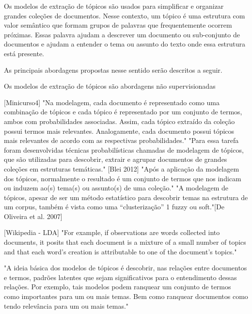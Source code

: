


Os modelos de extração de tópicos são usados para simplificar e organizar grandes coleções de documentos. Nesse contexto, um tópico é uma estrutura com valor semântico que formam grupos de palavras que frequentemente ocorrem próximas. Essas palavra ajudam a descrever um documento ou sub-conjunto de documentos e ajudam a entender o tema ou assunto do texto onde essa estrutura está presente.

As principais abordagens propostas nesse sentido serão descritos a seguir.

Os modelos de extração de tópicos são abordagens não supervisionadas 






[Minicurso4] 
"Na modelagem, cada documento é representado como uma combinação de tópicos e cada tópico é representado por um conjunto de termos, ambos com probabilidades associadas. Assim, cada tópico extraído da coleção possui termos mais relevantes. Analogamente, cada documento possui tópicos mais relevantes de acordo com as respectivas probabilidades."
"Para essa tarefa foram desenvolvidas técnicas probabilísticas chamadas de modelagem de tópicos, que são utilizadas para descobrir, extrair e agrupar documentos de grandes coleções em estruturas temáticas." [Blei 2012]
"Após a aplicação da modelagem dos tópicos, normalmente o resultado é um conjunto de termos que nos indicam ou induzem ao(s) tema(s) ou assunto(s) de uma coleção."
"A modelagem de tópicos, apesar de ser um método estatístico para descobrir temas na estrutura de um corpus, também é vista como uma “clusterização” 1 fuzzy ou soft."[De Oliveira et al. 2007]




[Wikipedia - LDA]
"For example, if observations are words collected into documents, it posits that each document is a mixture of a small number of topics and that each word's creation is attributable to one of the document's topics."

"A ideia básica dos modelos de tópicos é descobrir, nas relações entre documentos e termos, padrões latentes que sejam significativos para o entendimento dessas relações. Por exemplo, tais modelos podem ranquear um conjunto de termos como importantes para um ou mais temas. Bem como ranquear documentos como tendo relevância para um ou mais temas."



